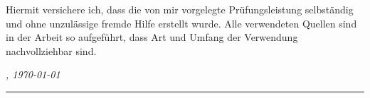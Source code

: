 %
\label{sec:declaration}
\thispagestyle{empty}


Hiermit versichere ich, dass die von mir vorgelegte Prüfungsleistung selbständig und ohne unzulässige fremde Hilfe erstellt wurde. 
Alle verwendeten Quellen sind in der Arbeit so aufgeführt, dass Art und Umfang der Verwendung nachvollziehbar sind.

\bigskip

\noindent\textit{\thesisUniversityCity, \large\today}

\smallskip

\begin{flushright}
	\begin{minipage}{5cm}
		\rule{\textwidth}{1pt}
		\centering\thesisName
	\end{minipage}
\end{flushright}

